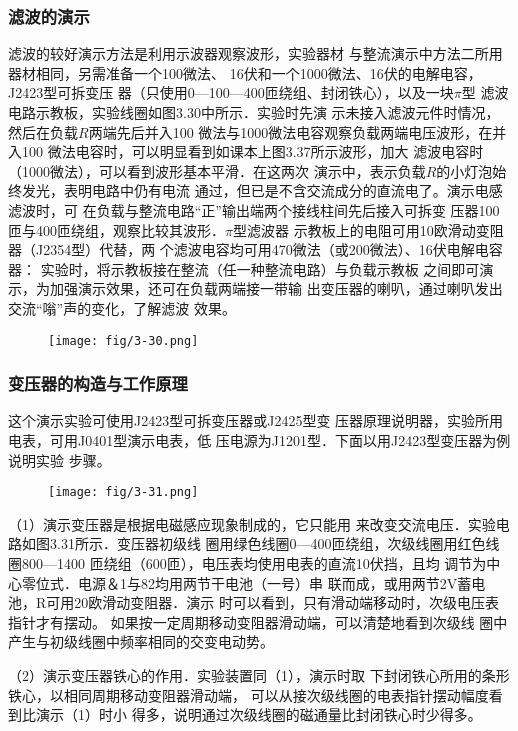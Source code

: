 \subsubsection{滤波的演示}
滤波的较好演示方法是利用示波器观察波形，实验器材
与整流演示中方法二所用器材相同，另需准备一个100微法、
16伏和一个1000微法、16伏的电解电容，J2423型可拆变压
器（只使用0—100—400匝绕组、封闭铁心），以及一块$\pi$型
滤波电路示教板，实验线圈如图3.30中所示．实验时先演
示未接入滤波元件时情况，然后在负载$R$两端先后并入100
微法与1000微法电容观察负载两端电压波形，在并入100
微法电容时，可以明显看到如课本上图3.37所示波形，加大
滤波电容时（1000微法），可以看到波形基本平滑．在这两次
演示中，表示负载$R$的小灯泡始终发光，表明电路中仍有电流
通过，但已是不含交流成分的直流电了。演示电感滤波时，可
在负载与整流电路“正”输出端两个接线柱间先后接入可拆变
压器100匝与400匝绕组，观察比较其波形．$\pi$型滤波器
示教板上的电阻可用10欧滑动变阻器（J2354型）代替，两
个滤波电容均可用470微法（或200微法）、16伏电解电容器：
实验时，将示教板接在整流（任一种整流电路）与负载示教板
之间即可演示，为加强演示效果，还可在负载两端接一带输
出变压器的喇叭，通过喇叭发出交流“嗡”声的变化，了解滤波
效果。

\begin{figure}[htp]
    \centering
\texttt{[image: fig/3-30.png]}
    \caption{}
\end{figure}

\subsubsection{变压器的构造与工作原理}
这个演示实验可使用J2423型可拆变压器或J2425型变
压器原理说明器，实验所用电表，可用J0401型演示电表，低
压电源为J1201型．下面以用J2423型变压器为例说明实验
步骤。
\begin{figure}[htp]
    \centering
\texttt{[image: fig/3-31.png]}
    \caption{}
\end{figure}

（1）演示变压器是根据电磁感应现象制成的，它只能用
来改变交流电压．实验电路如图3.31所示．变压器初级线
圈用绿色线圈0—400匝绕组，次级线圈用红色线圈800—1400
匝绕组（600匝），电压表均使用电表的直流10伏挡，且均
调节为中心零位式．电源＆1与82均用两节干电池（一号）串
联而成，或用两节2V蓄电池，R可用20欧滑动变阻器．演示
时可以看到，只有滑动端移动时，次级电压表指针才有摆动。
如果按一定周期移动变阻器滑动端，可以清楚地看到次级线
圈中产生与初级线圈中频率相同的交变电动势。

（2）演示变压器铁心的作用．实验装置同（1），演示时取
下封闭铁心所用的条形铁心，以相同周期移动变阻器滑动端，
可以从接次级线圈的电表指针摆动幅度看到比演示（1）时小
得多，说明通过次级线圈的磁通量比封闭铁心时少得多。

